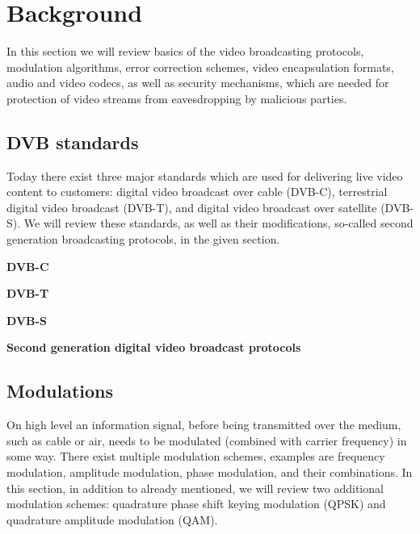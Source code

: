 \section{Background}
\label{section:background}

In this section we will review basics of the video broadcasting protocols,
modulation algorithms, error correction schemes, video encapsulation 
formats, audio and video codecs, as well as security mechanisms, which are
needed for protection of video streams from eavesdropping by malicious parties.

\subsection{DVB standards}

Today there exist three major standards which are used for delivering 
live video content to customers: digital video broadcast 
over cable (DVB-C), terrestrial digital video broadcast (DVB-T), and
digital video broadcast over satellite (DVB-S). We will review these 
standards, as well as their modifications, so-called second generation
broadcasting protocols, in the given section.

{\bf DVB-C}

{\bf DVB-T}

{\bf DVB-S}

{\bf Second generation digital video broadcast protocols}

\subsection{Modulations}

On high level an information signal, before being transmitted over the medium, such as cable
or air, needs to be modulated (combined with carrier frequency) in some way. 
There exist multiple modulation schemes, examples are frequency modulation, amplitude
modulation, phase modulation, and their combinations. In this section, in addition to already 
mentioned, we will review two additional modulation 
schemes: quadrature phase shift keying modulation (QPSK) 
and quadrature amplitude modulation (QAM).

